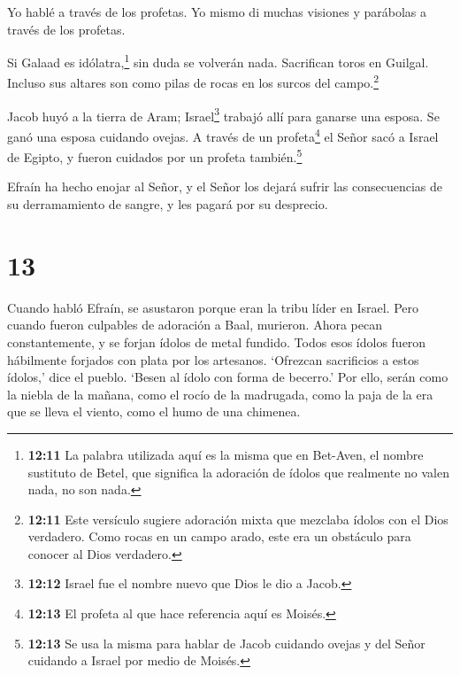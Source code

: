 Yo hablé a través de los profetas. Yo mismo di muchas
visiones y parábolas a través de los profetas.

 Si Galaad es idólatra,\footnote{\textbf{12:11} La palabra
  utilizada aquí es la misma que en Bet-Aven, el nombre sustituto de
  Betel, que significa la adoración de ídolos que realmente no valen
  nada, no son nada.} sin duda se volverán nada. Sacrifican toros en
Guilgal. Incluso sus altares son como pilas de rocas en los surcos del
campo.\footnote{\textbf{12:11} Este versículo sugiere adoración mixta
  que mezclaba ídolos con el Dios verdadero. Como rocas en un campo
  arado, este era un obstáculo para conocer al Dios verdadero.}

 Jacob huyó a la tierra de Aram; Israel\footnote{\textbf{12:12}
  Israel fue el nombre nuevo que Dios le dio a Jacob.} trabajó allí para
ganarse una esposa. Se ganó una esposa cuidando ovejas.  A
través de un profeta\footnote{\textbf{12:13} El profeta al que hace
  referencia aquí es Moisés.} el Señor sacó a Israel de Egipto, y fueron
cuidados por un profeta también.\footnote{\textbf{12:13} Se usa la misma
  para hablar de Jacob cuidando ovejas y del Señor cuidando a Israel por
  medio de Moisés.}

 Efraín ha hecho enojar al Señor, y el Señor los dejará
sufrir las consecuencias de su derramamiento de sangre, y les pagará por
su desprecio.

\hypertarget{section-12}{%
\section{13}\label{section-12}}

 Cuando habló Efraín, se asustaron porque eran la tribu
líder en Israel. Pero cuando fueron culpables de adoración a Baal,
murieron.  Ahora pecan constantemente, y se forjan ídolos de
metal fundido. Todos esos ídolos fueron hábilmente forjados con plata
por los artesanos. `Ofrezcan sacrificios a estos ídolos,' dice el
pueblo. `Besen al ídolo con forma de becerro.'  Por ello,
serán como la niebla de la mañana, como el rocío de la madrugada, como
la paja de la era que se lleva el viento, como el humo de una chimenea.

